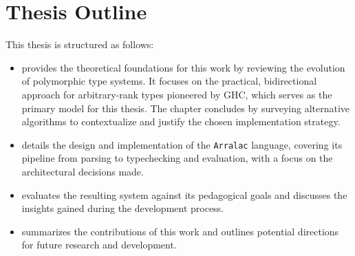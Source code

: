\section{Thesis Outline}

This thesis is structured as follows:

\begin{itemize}
    \item \textbf{} provides the theoretical foundations for this work by reviewing the evolution of polymorphic type systems. It focuses on the practical, bidirectional approach for arbitrary-rank types pioneered by GHC, which serves as the primary model for this thesis. The chapter concludes by surveying alternative algorithms to contextualize and justify the chosen implementation strategy.
    \item \textbf{} details the design and implementation of the \texttt{Arralac} language, covering its pipeline from parsing to typechecking and evaluation, with a focus on the architectural decisions made.
    \item \textbf{} evaluates the resulting system against its pedagogical goals and discusses the insights gained during the development process.
    \item \textbf{} summarizes the contributions of this work and outlines potential directions for future research and development.
\end{itemize}